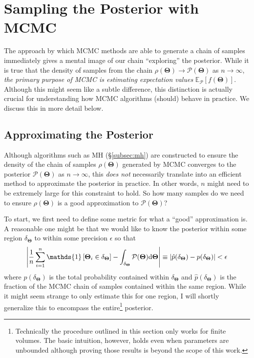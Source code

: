 \documentclass[12pt, titlepage]{article}
\newcommand{\deriv}{\ensuremath{{\rm d}}}  %
\newcommand{\meanwrt}[2]{\ensuremath{\mathbb{E}_{{#2}}\left[{#1}\right]}}
\newcommand{\indicator}[1]{\ensuremath{\mathds{1}\left[{#1}\right]}}
\newcommand{\params}{\ensuremath{\boldsymbol\Theta}}
\newcommand{\posterior}{\ensuremath{\mathcal{P}}}
\begin{document}
\section{Sampling the Posterior with MCMC} \label{sec:sampling}

The approach by which MCMC methods are able to generate a chain of
samples immediately gives a mental image of our chain ``exploring'' the
posterior. While it is true that the density of samples from the chain
$\rho(\params) \rightarrow \posterior(\params)$ as $n \rightarrow \infty$, 
\textit{the primary purpose of MCMC is estimating expectation values}
$\meanwrt{f(\params)}{\posterior}$.
Although this might seem like a subtle difference,
this distinction is actually crucial for understanding how MCMC
algorithms (should) behave in practice. We discuss this in more
detail below.

\subsection{Approximating the Posterior} \label{subsec:post_approx}

Although algorithms such as MH (\S\ref{subsec:mh}) are constructed to
ensure the density of the chain of samples $\rho(\params)$
generated by MCMC converges to the posterior $\posterior(\params)$
as $n \rightarrow \infty$, this \textit{does not} necessarily translate
into an efficient method to approximate the posterior in practice. In
other words, $n$ might need to be extremely large for this constraint to hold.
So how many samples do we need to ensure $\rho(\params)$ is a good approximation
to $\posterior(\params)$?

To start, we first need to define some metric for what a ``good''
approximation is. A reasonable one might be that we would like
to know the posterior within some region $\delta_{\params}$
to within some precision $\epsilon$ so that
\begin{equation}
    \left| \frac{1}{n} \sum_{i=1}^{n} \indicator{\params_i \in \delta_{\params}} 
    - \int_{\delta_{\params}} \posterior(\params) \deriv \params \right|
    \equiv |\hat{p}(\delta_{\params}) - p(\delta_{\params})| < \epsilon
\end{equation}
where $p(\delta_{\params})$ is the total probability contained within
$\delta_{\params}$ and $\hat{p}(\delta_{\params})$ is the fraction of
the MCMC chain of samples contained within the same region. While it might
seem strange to only estimate this for one region, I will shortly
generalize this to encompass the
entire\footnote{Technically the procedure outlined in this section
only works for finite volumes. The basic intuition, however, holds even
when parameters are unbounded although proving those results is beyond
the scope of this work.} posterior.
\end{document}

